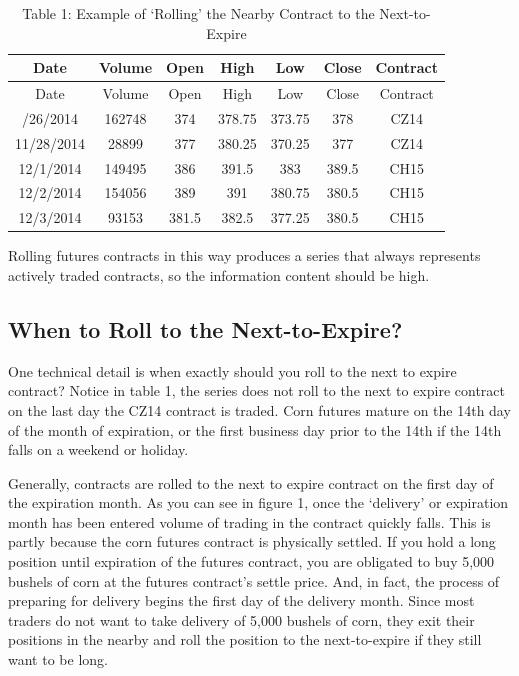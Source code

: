 \documentclass[
  letterpaper,
  DIV=11,
  numbers=noendperiod]{scrreprt}
\begin{document}
\begin{longtable}[]{@{}ccccccc@{}}
\caption{Table 1: Example of `Rolling' the Nearby Contract to the
Next-to-Expire}\tabularnewline
\toprule\noalign{}
Date & Volume & Open & High & Low & Close & Contract \\
\midrule\noalign{}
\endfirsthead
\toprule\noalign{}
Date & Volume & Open & High & Low & Close & Contract \\
\midrule\noalign{}
\endhead
\bottomrule\noalign{}
\endlastfoot
11/26/2014 & 162748 & 374 & 378.75 & 373.75 & 378 & CZ14 \\
11/28/2014 & 28899 & 377 & 380.25 & 370.25 & 377 & CZ14 \\
12/1/2014 & 149495 & 386 & 391.5 & 383 & 389.5 & CH15 \\
12/2/2014 & 154056 & 389 & 391 & 380.75 & 380.5 & CH15 \\
12/3/2014 & 93153 & 381.5 & 382.5 & 377.25 & 380.5 & CH15 \\
\end{longtable}

Rolling futures contracts in this way produces a series that always
represents actively traded contracts, so the information content should
be high.

\hypertarget{when-to-roll-to-the-next-to-expire}{%
\subsection{When to Roll to the
Next-to-Expire?}\label{when-to-roll-to-the-next-to-expire}}

One technical detail is when exactly should you roll to the next to
expire contract? Notice in table 1, the series does not roll to the next
to expire contract on the last day the CZ14 contract is traded. Corn
futures mature on the 14th day of the month of expiration, or the first
business day prior to the 14th if the 14th falls on a weekend or
holiday.

Generally, contracts are rolled to the next to expire contract on the
first day of the expiration month. As you can see in figure 1, once the
`delivery' or expiration month has been entered volume of trading in the
contract quickly falls. This is partly because the corn futures contract
is physically settled. If you hold a long position until expiration of
the futures contract, you are obligated to buy 5,000 bushels of corn at
the futures contract's settle price. And, in fact, the process of
preparing for delivery begins the first day of the delivery month. Since
most traders do not want to take delivery of 5,000 bushels of corn, they
exit their positions in the nearby and roll the position to the
next-to-expire if they still want to be long.
\end{document}
